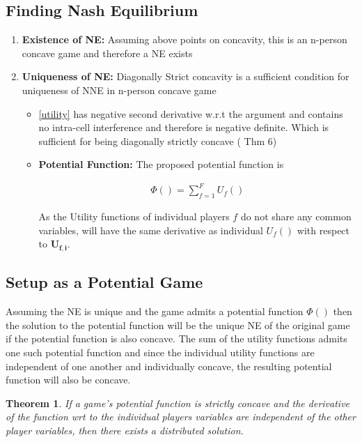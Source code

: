 \documentclass[12pt]{article}
\newtheorem{theorem}{Theorem}
\begin{document}
\subsection{Finding Nash Equilibrium}

\begin{enumerate}
\item \textbf{Existence of NE:} Assuming above points on concavity, this is an n-person concave game and therefore a NE exists
\item \textbf{Uniqueness of NE:} Diagonally Strict concavity is a sufficient condition for uniqueness of NNE in n-person concave game
\begin{itemize}
\item\eqref{utility} has negative second derivative w.r.t the argument and contains no intra-cell interference and therefore is negative definite. Which is sufficient for being diagonally strictly concave
\cite[Thm6]{rosen1964existence} ( Thm 6)

\item \textbf{Potential Function:} The proposed potential function is 

\begin{gather*} \label{Potential_Function}
\Phi() = \sum_{f = 1}^{F} U_f() 
\end{gather*}


As the Utility functions of individual players $f$ do not share any common variables,  \label{Potential_Function} will have the same derivative as individual $U_f()$ with respect to $\mathbf{U_{f,i}} $. 


\end{itemize}

\end{enumerate}

\subsection{Setup as a Potential Game}
Assuming the NE is unique and the game admits a potential function $\Phi()$ then the solution to the potential function will be the unique NE of the original game if the potential function is also concave. 
The sum of the utility functions admits one such potential function and since the individual utility functions are independent of one another and individually concave, the resulting potential function will also be concave. 
\\
\begin{theorem}\label{distributed}
If a game's potential function is strictly concave and the derivative of the function wrt to the individual players variables are independent of the other player variables, then there exists a distributed solution.
\end{theorem}
\end{document}
